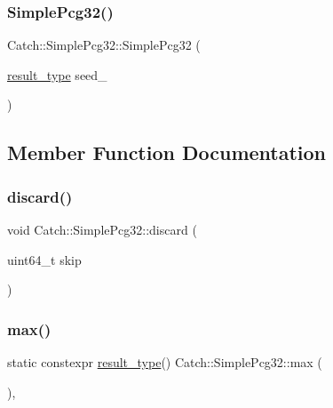 \mbox{\label{class_catch_1_1_simple_pcg32_a901fc48d250c3d92b1ec067bcc6155c1}} 
\subsubsection{\texorpdfstring{Simple\+Pcg32()}{SimplePcg32()}\hspace{0.1cm}{\footnotesize\ttfamily [2/2]}}
{\footnotesize\ttfamily Catch\+::\+Simple\+Pcg32\+::\+Simple\+Pcg32 (\begin{DoxyParamCaption}\item[{\mbox{\hyperlink{class_catch_1_1_simple_pcg32_a220ca38f6d16804c6e99937a673ec3ff}{result\+\_\+type}}}]{seed\+\_\+ }\end{DoxyParamCaption})\hspace{0.3cm}{\ttfamily [explicit]}}



\subsection{Member Function Documentation}
\mbox{\label{class_catch_1_1_simple_pcg32_a877e7a9c14d378af729ad19a0e959178}} 
\subsubsection{\texorpdfstring{discard()}{discard()}}
{\footnotesize\ttfamily void Catch\+::\+Simple\+Pcg32\+::discard (\begin{DoxyParamCaption}\item[{uint64\+\_\+t}]{skip }\end{DoxyParamCaption})}

\mbox{\label{class_catch_1_1_simple_pcg32_a282cfed1bcba2ae23f242913489195af}} 
\subsubsection{\texorpdfstring{max()}{max()}}
{\footnotesize\ttfamily static constexpr \mbox{\hyperlink{class_catch_1_1_simple_pcg32_a220ca38f6d16804c6e99937a673ec3ff}{result\+\_\+type}}() Catch\+::\+Simple\+Pcg32\+::max (\begin{DoxyParamCaption}{ }\end{DoxyParamCaption})\hspace{0.3cm}{\ttfamily [inline]}, {\ttfamily [static]}}

